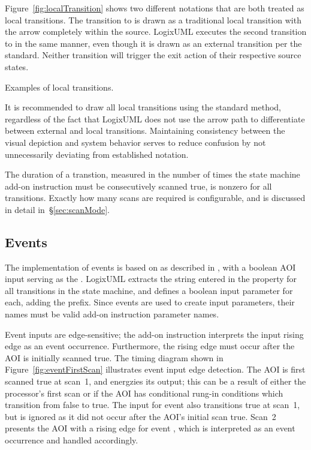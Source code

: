 Figure~\ref{fig:localTransition} shows two different notations that are both
treated as local transitions. The transition to  is drawn
as a traditional local transition with the arrow completely within the
source. LogixUML executes the second transition to  in the
same manner, even though it is drawn as an external transition per the
standard. Neither transition will trigger the exit action of their
respective source states.

               {Examples of local transitions.}

It is recommended to draw all local transitions using the standard method,
regardless of the fact that LogixUML does not use the arrow path
to differentiate between external and local transitions. Maintaining
consistency between the visual depiction and system behavior serves to
reduce confusion by not unnecessarily deviating from established
notation.

The duration of a transtion, measured in the number of times the state machine
add-on instruction must be consecutively scanned true, is nonzero for all
transitions. Exactly how many scans are required is configurable,
and is discussed in detail in~\S\ref{sec:scanMode}.


\subsection{Events}

The implementation of events is based on 
as described in \textcite[\S13.3.3.3]{OMGUML}, with a boolean AOI input
serving as the . LogixUML extracts
the string entered in the  property for
all transitions
in the state machine, and defines a boolean input parameter for each,
adding the  prefix. Since events are used to create
input parameters, their names must be valid add-on instruction parameter
names.

Event inputs are edge-sensitive; the add-on instruction interprets the
input rising edge as an event occurrence. Furthermore,
the rising edge must occur after the AOI is initially scanned true.
The timing diagram shown in Figure~\ref{fig:eventFirstScan} illustrates
event input edge detection. The AOI is first scanned true at scan~1, and
energzies its  output; this can be a result of either
the processor's first scan or if the AOI has conditional rung-in
conditions which transition from false to true.
The input for event  also transitions true at scan~1, but
is ignored as it did not occur after the AOI's initial scan true.
Scan~2 presents the AOI with a rising edge for event ,
which is interpreted as an event occurrence and handled accordingly.


